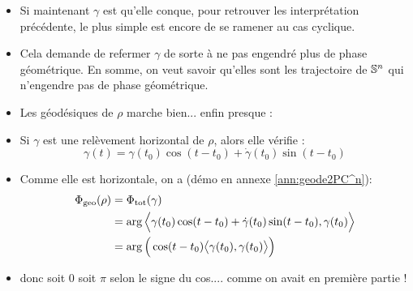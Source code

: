 	
\begin{itemize}
	
	\item Si maintenant $\gamma$ est qu'elle conque, pour retrouver les interprétation précédente, le plus simple est encore de se ramener au cas cyclique.
	
	\item Cela demande de refermer $\gamma$ de sorte à ne pas engendré plus de phase géométrique. En somme, on veut savoir qu'elles sont les trajectoire de $\S{n}$ qui n'engendre pas de phase géométrique.
	
	\item Les géodésiques de $\rho$ marche bien... enfin presque :
	
	\item Si $\gamma$ est une relèvement horizontal de $\rho$, alors elle vérifie :
	\[\gamma(t) = \gamma(t_0) \cos (t - t_0) + \dot{\gamma}(t_0) \sin (t - t_0)\]
	
	\item Comme elle est horizontale, on a  (démo en annexe \ref{ann:geode2PC^n}):
\begin{align*}
	\phaseg(\rho) &= \phaset(\gamma) \\
	&= \arg\Big\langle \gamma(t_0) \cos (t - t_0) + \dot{\gamma}(t_0) \sin (t - t_0),  \gamma(t_0) \Big\rangle \\
	&= \arg\Big(\cos (t - t_0)\big\langle \gamma(t_0) ,  \gamma(t_0) \big\rangle\Big)
\end{align*}
	
	\item donc soit 0 soit $\pi$ selon le signe du cos.... comme on avait en première partie !
\end{itemize}

